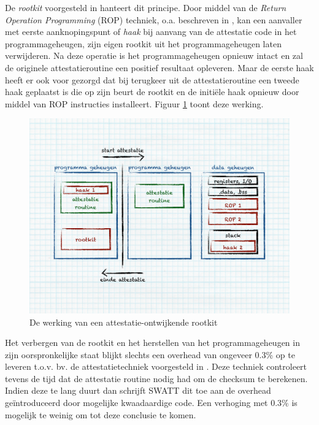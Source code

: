 De \emph{rootkit} voorgesteld in \citep{castelluccia2009difficulty} hanteert
dit principe. Door middel van de \emph{Return Operation Programming} (ROP)
techniek, o.a. beschreven in \citep{prandini2012return}, kan een aanvaller met
eerste aanknopingspunt of \emph{haak} bij aanvang van de attestatie code in het
programmageheugen, zijn eigen rootkit uit het programmageheugen laten
verwijderen. Na deze operatie is het programmageheugen opnieuw intact en zal de
originele attestatieroutine een positief resultaat opleveren. Maar de eerste
haak heeft er ook voor gezorgd dat bij terugkeer uit de attestatieroutine een
tweede haak geplaatst is die op zijn beurt de rootkit en de initi\"ele haak
opnieuw door middel van ROP instructies installeert. Figuur
\ref{fig:attestation-rootkit} toont deze werking.

\begin{figure}[ht]
  \centering
  \includegraphics[width=0.9\linewidth]{resources/attestation-rootkit.pdf}
  \caption{De werking van een attestatie-ontwijkende rootkit}
  \label{fig:attestation-rootkit}
\end{figure}

Het verbergen van de rootkit en het herstellen van het programmageheugen in
zijn oorspronkelijke staat blijkt slechts een overhead van ongeveer 0.3\% op te
leveren t.o.v. bv. de attestatietechniek voorgesteld in
\citep{seshadri2004swatt}. Deze techniek controleert tevens de tijd dat de
attestatie routine nodig had om de checksum te berekenen. Indien deze te lang
duurt dan schrijft SWATT dit toe aan de overhead ge\"introduceerd door
mogelijke kwaadaardige code. Een verhoging met 0.3\% is mogelijk te weinig om
tot deze conclusie te komen.

